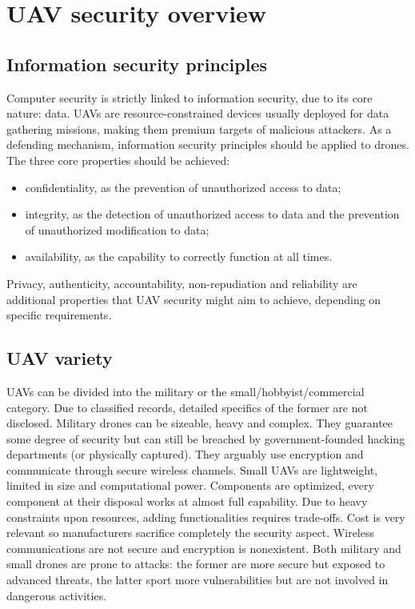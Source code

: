 \documentclass[journal]{IEEEtran}
\begin{document}
\section{UAV security overview}

\subsection{Information security principles}

Computer security is strictly linked to information security, due to its core nature: data. UAVs are resource-constrained devices usually deployed for data gathering missions, making them premium targets of malicious attackers. As a defending mechanism, information security principles should be applied to drones. The three core properties should be achieved:
\begin{itemize}
\item confidentiality, as the prevention of unauthorized access to data;
\item integrity, as the detection of unauthorized access to data and the prevention of unauthorized modification to data;
\item availability, as the capability to correctly function at all times.
\end{itemize}
Privacy, authenticity, accountability, non-repudiation and reliability are additional properties that UAV security might aim to achieve, depending on specific requirements.

\subsection{UAV variety}
UAVs can be divided into the military or the small/hobbyist/commercial category. Due to classified records, detailed specifics of the former are not disclosed. Military drones can be sizeable, heavy and complex. They guarantee some degree of security but can still be breached by government-founded hacking departments (or physically captured). They arguably use encryption and communicate through secure wireless channels. Small UAVs are lightweight, limited in size and computational power. Components are optimized, every component at their disposal works at almost full capability. Due to heavy constraints upon resources, adding functionalities requires trade-offs. Cost is very relevant so manufacturers sacrifice completely the security aspect. Wireless communications are not secure and encryption is nonexistent. Both military and small drones are prone to attacks: the former are more secure but exposed to advanced threats, the latter sport more vulnerabilities but are not involved in dangerous activities.
\end{document}
